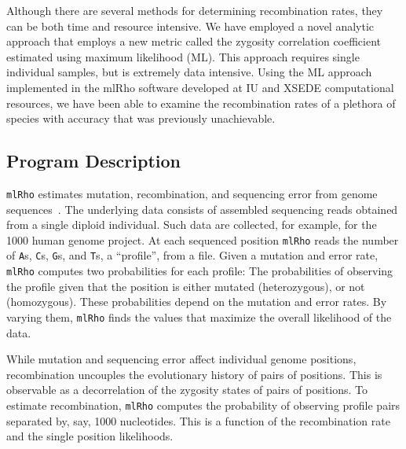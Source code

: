 \documentclass{sig-alternate}
\newcommand{\ty}{\texttt}
\begin{document}
Although there are several methods for determining recombination rates, they can be both time and resource
intensive. We have employed a novel analytic approach that employs a new metric called the zygosity
correlation coefficient estimated using maximum likelihood (ML). This approach requires single individual
samples, but is extremely data intensive. Using the ML approach implemented in the mlRho software developed at
IU and XSEDE computational resources, we have been able to examine the recombination rates of a plethora of
species with accuracy that was previously unachievable.

\subsection{Program Description}
\texttt{mlRho} estimates mutation, recombination, and sequencing error from genome
sequences~\cite{hau10:mlr}. The underlying data consists of assembled sequencing reads obtained from a single
diploid individual. Such data are collected, for example, for the 1000 human genome project. At each sequenced
position \texttt{mlRho} reads the number of \ty{A}s, \ty{C}s, \ty{G}s, and \ty{T}s, a ``profile'', from a
file. Given a mutation and error rate, \ty{mlRho} computes two probabilities for each profile: The
probabilities of observing the profile given that the position is either mutated (heterozygous), or not
(homozygous). These probabilities depend on the mutation and error rates. By varying them, \ty{mlRho} finds
the values that maximize the overall likelihood of the data.

While mutation and sequencing error affect individual genome positions, recombination uncouples the
evolutionary history of pairs of positions. This is observable as a decorrelation of the zygosity states of
pairs of positions. To estimate recombination, \ty{mlRho} computes the probability of observing profile pairs
separated by, say, 1000 nucleotides. This is a function of the recombination rate and the single position
likelihoods.
\end{document}

